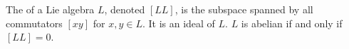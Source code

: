 The  of a Lie algebra $L$, denoted $[LL]$, is the subspace spanned by all commutators $[xy]$ for $x, y \in L$. It is an ideal of $L$. $L$ is abelian if and only if $[LL] = 0$.
